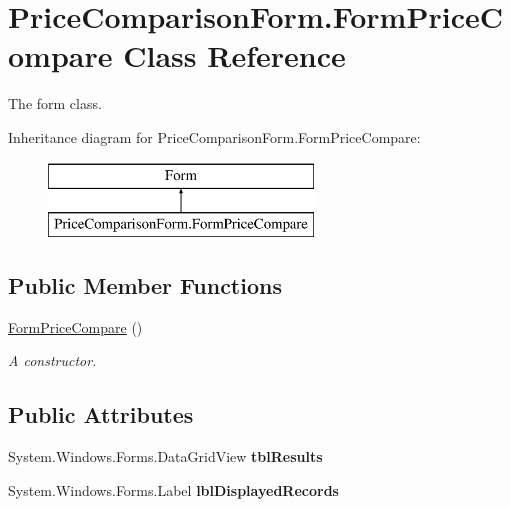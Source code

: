 \hypertarget{class_price_comparison_form_1_1_form_price_compare}{\section{Price\-Comparison\-Form.\-Form\-Price\-Compare Class Reference}
\label{class_price_comparison_form_1_1_form_price_compare}
}


The form class.  


Inheritance diagram for Price\-Comparison\-Form.\-Form\-Price\-Compare\-:\begin{figure}[H]
\begin{center}
\leavevmode
\includegraphics[height=2.000000cm]{class_price_comparison_form_1_1_form_price_compare}
\end{center}
\end{figure}
\subsection*{Public Member Functions}
\begin{DoxyCompactItemize}
\item 
\hyperlink{class_price_comparison_form_1_1_form_price_compare_a8a154c7558a47e962aa763871ce2c6d7}{Form\-Price\-Compare} ()
\begin{DoxyCompactList}\small\item\em A constructor. \end{DoxyCompactList}\end{DoxyCompactItemize}
\subsection*{Public Attributes}
\begin{DoxyCompactItemize}
\item 
\hypertarget{class_price_comparison_form_1_1_form_price_compare_ac5c61e93d503ad9c9c12bfc8821ca953}{System.\-Windows.\-Forms.\-Data\-Grid\-View {\bfseries tbl\-Results}}\label{class_price_comparison_form_1_1_form_price_compare_ac5c61e93d503ad9c9c12bfc8821ca953}

\item 
\hypertarget{class_price_comparison_form_1_1_form_price_compare_a2e759b9b209d6aaff377bcd271f88311}{System.\-Windows.\-Forms.\-Label {\bfseries lbl\-Displayed\-Records}}\label{class_price_comparison_form_1_1_form_price_compare_a2e759b9b209d6aaff377bcd271f88311}

\end{DoxyCompactItemize}
